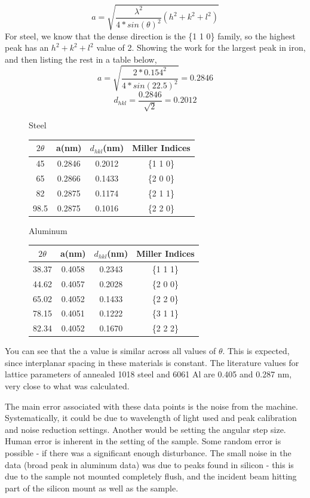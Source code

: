 \documentclass{article}
\begin{document}
$$a = \sqrt{\frac{\lambda ^2}{4*sin(\theta)^2}(h^2+k^2+l^2)}$$
For steel, we know that the dense direction is the \{1 1 0\} family, so the highest peak has an $h^2+k^2+l^2$ value of 2.  Showing the work for the largest peak in iron, and then listing the rest in a table below,
$$a = \sqrt{\frac{2*0.154^2}{4*sin(22.5)^2}} = 0.2846$$
$$d_{hkl} = \frac{0.2846}{\sqrt{2}} = 0.2012$$

\begin{figure}[h]
	\begin{minipage}{0.5\textwidth}
		\centering
		Steel
		
		\begin{tabular}{|| c | c | c | c ||}
		 \hline
		 $2\theta$ & a(nm) & $d_{hkl}$(nm) & Miller Indices\\
		 \hline
		 \hline
		 45 & 0.2846 & 0.2012 & \{1 1 0\}\\
		 \hline
		 65 & 0.2866 & 0.1433 & \{2 0 0\}\\
		 \hline
		 82 & 0.2875 & 0.1174 & \{2 1 1\}\\
		 \hline
		 98.5 & 0.2875 & 0.1016 & \{2 2 0\}\\
		 \hline
		\end{tabular}
	\end{minipage}
	\begin{minipage}{0.5\textwidth}
		\centering
		Aluminum
		
		\begin{tabular}{|| c | c | c | c ||}
		 \hline
		 $2\theta$ & a(nm) & $d_{hkl}$(nm) & Miller Indices\\
		 \hline
		 \hline
		 38.37 & 0.4058 & 0.2343 & \{1 1 1\}\\
		 \hline
		 44.62 & 0.4057 & 0.2028 & \{2 0 0\}\\
		 \hline
		 65.02 & 0.4052 & 0.1433 & \{2 2 0\}\\
		 \hline
		 78.15 & 0.4051 & 0.1222 & \{3 1 1\}\\
		 \hline
		 82.34 & 0.4052 & 0.1670 & \{2 2 2\}\\
		 \hline
		\end{tabular}
	\end{minipage}
\end{figure}

You can see that the a value is similar across all values of $\theta$. This is expected, since interplanar spacing in these materials is constant. The literature values for lattice parameters of annealed 1018 steel and 6061 Al are 0.405 and 0.287 nm, very close to what was calculated.

The main error associated with these data points is the noise from the machine. Systematically, it could be due to wavelength of light used and peak calibration and noise reduction settings. Another would be setting the angular step size. Human error is inherent in the setting of the sample. Some random error is possible - if there was a significant enough disturbance. The small noise in the data (broad peak in aluminum data) was due to peaks found in silicon - this is due to the sample not mounted completely flush, and the incident beam hitting part of the silicon mount as well as the sample.
\end{document}
